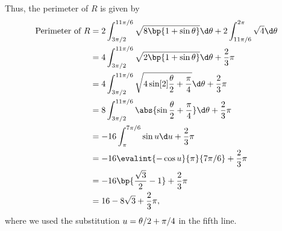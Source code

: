 \begin{solution}
\begin{ppart}
        Thus, the perimeter of $R$ is given by
        \begin{align*}
            \text{Perimeter of $R$} &= 2 \int_{3\pi/2}^{11\pi/6} \sqrt{8\bp{1 + \sin \t}} \d \t + 2 \int_{11\pi/6}^{2\pi} \sqrt{4} \d \t\\
            &= 4 \int_{3\pi/2}^{11\pi/6} \sqrt{2\bp{1 + \sin \t}} \d \t + \frac23 \pi\\
            &= 4 \int_{3\pi/2}^{11\pi/6} \sqrt{4\sin[2]{\frac\t2 + \frac\pi4}} \d \t + \frac23 \pi\\
            &= 8 \int_{3\pi/2}^{11\pi/6} \abs{\sin{\frac\t2 + \frac\pi4}} \d \t + \frac23 \pi\\
            &= -16 \int_{\pi}^{7\pi/6} \sin u \d u + \frac{2}{3}\pi\\
            &= -16 \evalint{-\cos u}{\pi}{7\pi/6} + \frac{2}3\pi\\
            &= -16\bp{\frac{\sqrt3}{2} - 1} + \frac23 \pi\\
            &= 16 - 8\sqrt{3} + \frac23 \pi,
        \end{align*}
        where we used the substitution $u = \theta/2 + \pi/4$ in the fifth line. 
    \end{ppart}
\end{solution}

